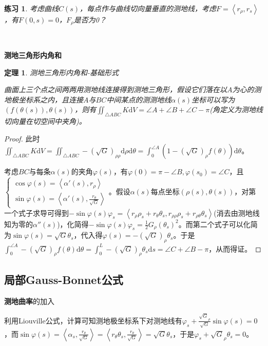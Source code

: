\documentclass[a4paper,UTF8,fontset=windows]{ctexart}
\newtheorem{thm}{定理}[section]
\newtheorem*{hw}{练习}
\begin{document}
\begin{hw}
考虑曲线$C(s)$，每点作与曲线切向量垂直的测地线，考虑$F=\left<r_\rho,r_s\right>$，有$F(0,s)=0$，$F_\rho$是否为0？
\end{hw}

\

\textbf{测地三角形内角和}

\begin{thm} 测地三角形内角和-基础形式

曲面上三个点之间两两用测地线连接得到测地三角形，假设它们落在以$A$为心的测地极坐标系之内，且连接$A$与$BC$中间某点的测测地线$\alpha(s)$坐标可以写为$(f(\theta(s)),\theta(s))$，则有$\iint_{\triangle ABC}K\mathrm{d}V=\angle A+\angle B+\angle C-\pi$(角定义为测地线切向量在切空间中夹角)。
\end{thm}

\begin{proof}
此时$\iint_{\triangle ABC}K\mathrm{d}V=\iint_{\triangle ABC}-(\sqrt{G})_{\rho\rho}\mathrm{d}\rho\mathrm{d}\theta=\int_0^{\angle A}(1-(\sqrt{G})_\rho f(\theta))\mathrm{d}\theta$。

考虑$BC$与每条$\alpha(s)$的夹角$\varphi(s)$，有$\varphi(0)=\pi-\angle B,\varphi(s_0)=\angle C$，且$\begin{cases}\cos\varphi(s)=\left<\alpha'(s),r_\rho\right>\\\sin\varphi(s)=\left<\alpha'(s),\frac{r_\theta}{\sqrt{G}}\right>\end{cases}$。假设$\alpha(s)$每点坐标$(\rho(s),\theta(s))$，对第一个式子求导可得到$-\sin\varphi(s)\varphi_s=\left<r_\rho\rho_s+r_\theta\theta_s,r_{\rho\rho}\rho_s+r_{\rho\theta}\theta_s\right>$(消去由测地线知为零的$\alpha''(s)$)，化简得$-\sin\varphi(s)\varphi_s=\frac{1}{2}G_\rho(\theta_s)^2$。而第二个式子可以化简为$\sin\varphi(s)=\sqrt{G}\theta_s$，代入得$\varphi(s)=-(\sqrt{G})_\rho\theta_s$。于是$\int_0^{\angle A}-(\sqrt{G})_\rho f(\theta)\mathrm{d}\theta=\int_0^L-(\sqrt{G})_\rho\theta_s\mathrm{d}s=\angle C+\angle B-\pi$，从而得证。
\end{proof}

\subsection{局部Gauss-Bonnet公式}

\textbf{测地曲率}的加入

利用Liouville公式，计算可知测地极坐标系下对测地线有$\varphi_s+\frac{\sqrt{G}_\rho}{\sqrt{G}}\sin\varphi(s)=0$，而$\sin\varphi(s)=\left<\alpha_s,\frac{r_\theta}{\sqrt{G}}\right>=\left<r_\theta\theta_s,\frac{r_\theta}{\sqrt{G}}\right>=\sqrt{G}\theta_s$，于是$\varphi_s+\sqrt{G}_\rho\theta_s=0$。
\end{document}

